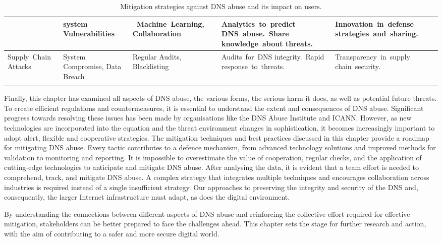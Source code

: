 {\begin{longtable}{|p{2.5cm}|p{2.5cm}|p{4cm}|p{3cm}|p{4cm}|}
{\mbox{Exploiting} Emerging \mbox{Technologies} & system \mbox{Vulnerabilities} &\mbox{ Machine Learning,} \mbox{Collaboration} & \mbox{Analytics to predict} \mbox{DNS abuse. Share} \mbox{knowledge about} \mbox{threats.} & \mbox{Innovation in defense}  \mbox{strategies and sharing.} \\ \hline

\mbox{Supply Chain} \mbox{Attacks} & \mbox{System} \mbox{Compromise,} Data Breach & Regular Audits, Blacklisting & \mbox{Audits for DNS} \mbox{integrity. Rapid} \mbox{response to threats.} & \mbox{Transparency in supply} \mbox{chain security.} \\ \hline

\caption{Mitigation strategies against DNS abuse and its impact on users.} 

\end{longtable}

}


Finally, this chapter has examined all aspects of DNS abuse,  the various forms, the serious harm it does, as well as potential future threats. To create efficient regulations and countermeasures, it is essential to understand the extent and consequences of DNS abuse. Significant progress towards resolving these issues has been made by organisations like the DNS Abuse Institute and ICANN. However, as new technologies are incorporated into the equation and the threat environment changes in sophistication, it becomes increasingly important to adopt alert, flexible and cooperative strategies. The mitigation techniques and best practices discussed in this chapter provide a roadmap for mitigating DNS abuse. Every tactic contributes to a defence mechanism, from advanced technology solutions and improved methods for validation to monitoring and reporting. It is impossible to overestimate the value of cooperation, regular checks, and the application of cutting-edge technologies to anticipate and mitigate DNS abuse. After analysing the data, it is evident that a team effort is needed to comprehend, track, and mitigate DNS abuse. A complex strategy that integrates multiple techniques and encourages collaboration across industries is required instead of a single insufficient strategy. Our approaches to preserving the integrity and security of the DNS and, consequently, the larger Internet infrastructure must adapt, as does the digital environment.

By understanding the connections between different aspects of DNS abuse and reinforcing the collective effort required for effective mitigation, stakeholders can be better prepared to face the challenges ahead. This chapter sets the stage for further research and action, with the aim of contributing to a safer and more secure digital world.



